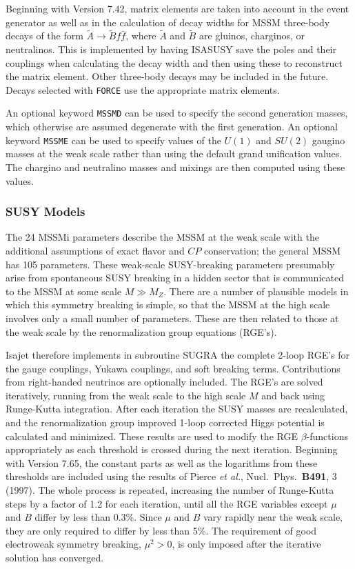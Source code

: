       Beginning with Version 7.42, matrix elements are taken into
account in the event generator as well as in the calculation of decay
widths for MSSM three-body decays of the form $\tilde A \to \tilde B f
\bar f$, where $\tilde A$ and $\tilde B$ are gluinos, charginos, or
neutralinos. This is implemented by having ISASUSY save the poles and
their couplings when calculating the decay width and then using these
to reconstruct the matrix element. Other three-body decays may be
included in the future. Decays selected with \verb|FORCE| use the
appropriate matrix elements.

      An optional keyword \verb|MSSMD| can be used to specify the second
generation masses, which otherwise are assumed degenerate with the first
generation. An optional keyword \verb|MSSME| can be used to specify
values of the $U(1)$ and $SU(2)$ gaugino masses at the weak scale rather
than using the default grand unification values. The chargino and
neutralino masses and mixings are then computed using these values.

\subsubsection{SUSY Models} The 24 MSSMi parameters describe the MSSM at
the weak scale with the additional assumptions of exact flavor and $CP$
conservation; the general MSSM has 105 parameters. These weak-scale
SUSY-breaking parameters presumably arise from spontaneous SUSY breaking
in a hidden sector that is communicated to the MSSM at some scale $M \gg
M_Z$. There are a number of plausible models in which this symmetry
breaking is simple, so that the MSSM at the high scale involves only a
small number of parameters. These are then related to those at the weak
scale by the renormalization group equations (RGE's).

      Isajet therefore implements in subroutine SUGRA the complete
2-loop RGE's for the gauge couplings, Yukawa couplings, and soft
breaking terms. Contributions from right-handed neutrinos are
optionally included. The RGE's are solved iteratively, running from
the weak scale to the high scale $M$ and back using Runge-Kutta
integration. After each iteration the SUSY masses are recalculated,
and the renormalization group improved 1-loop corrected 
Higgs potential is calculated and minimized. These results are
used to modify the RGE $\beta$-functions appropriately as each
threshold is crossed during the next iteration. Beginning with Version
7.65, the constant parts as well as the logarithms from these
thresholds are included using the results of Pierce {\it et al.},
Nucl.\ Phys.\ {\bf B491}, 3 (1997). The whole process is repeated,
increasing the number of Runge-Kutta steps by a factor of 1.2 for each
iteration, until all the RGE variables except $\mu$ and $B$ differ by
less than 0.3\%. Since $\mu$ and $B$ vary rapidly near the weak scale,
they are only required to differ by less than 5\%. The requirement of
good electroweak symmetry breaking, $\mu^2>0$, is only imposed after
the iterative solution has converged.

